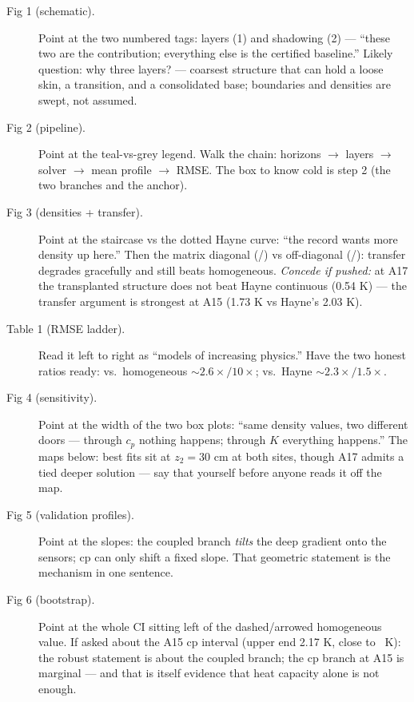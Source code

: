 \documentclass[11pt]{article}
\begin{document}
\begin{description}
  \item[Fig 1 (schematic).] Point at the two numbered tags: layers (1) and
    shadowing (2) --- ``these two are the contribution; everything else is the
    certified baseline.'' Likely question: why three layers? --- coarsest
    structure that can hold a loose skin, a transition, and a consolidated
    base; boundaries and densities are swept, not assumed.
  \item[Fig 2 (pipeline).] Point at the teal-vs-grey legend. Walk the chain:
    horizons $\to$ layers $\to$ solver $\to$ mean profile $\to$ RMSE. The
    box to know cold is step 2 (the two branches and the anchor).
  \item[Fig 3 (densities + transfer).] Point at the staircase vs the dotted
    Hayne curve: ``the record wants more density up here.'' Then the matrix
    diagonal (\rmsecKAfif/\rmsecKAsev) vs off-diagonal
    (\xferatAsev/\xferatAfif): transfer degrades gracefully and still beats
    homogeneous. \emph{Concede if pushed:} at A17 the transplanted structure
    does not beat Hayne continuous (0.54 K) --- the transfer argument is
    strongest at A15 (1.73 K vs Hayne's 2.03 K).
  \item[Table 1 (RMSE ladder).] Read it left to right as ``models of
    increasing physics.'' Have the two honest ratios ready: vs.\ homogeneous
    ${\sim}2.6\times/10\times$; vs.\ Hayne ${\sim}2.3\times/1.5\times$.
  \item[Fig 4 (sensitivity).] Point at the width of the two box plots:
    ``same density values, two different doors --- through $c_p$ nothing
    happens; through $K$ everything happens.'' The maps below: best fits sit
    at $z_2=30$ cm at both sites, though A17 admits a tied deeper solution
    --- say that yourself before anyone reads it off the map.
  \item[Fig 5 (validation profiles).] Point at the slopes: the coupled
    branch \emph{tilts} the deep gradient onto the sensors; cp can only
    shift a fixed slope. That geometric statement is the mechanism in one
    sentence.
  \item[Fig 6 (bootstrap).] Point at the whole CI sitting left of the
    dashed/arrowed homogeneous value. If asked about the A15 cp interval
    (upper end 2.17 K, close to \rmsehomAfif\ K): the robust statement is
    about the coupled branch; the cp branch at A15 is marginal --- and
    that is itself evidence that heat capacity alone is not enough.
\end{description}
\end{document}
